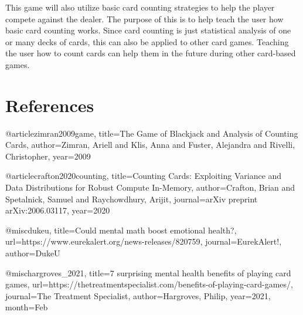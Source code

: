 \documentclass[12pt]{article}
\begin{document}
This game will also utilize basic card counting strategies to help the player compete against the dealer. The purpose of this is to help teach the user how basic card counting works. Since card counting is just statistical analysis of one or many decks of cards, this can also be applied to other card games. Teaching the user how to count cards can help them in the future during other card-based games. 


\newpage
\section{References}
\printbibliography[heading=subbibintoc]



@article{zimran2009game,
  title={The Game of Blackjack and Analysis of Counting Cards},
  author={Zimran, Ariell and Klis, Anna and Fuster, Alejandra and Rivelli, Christopher},
  year={2009}
}

@article{crafton2020counting,
  title={Counting Cards: Exploiting Variance and Data Distributions for Robust Compute In-Memory},
  author={Crafton, Brian and Spetalnick, Samuel and Raychowdhury, Arijit},
  journal={arXiv preprint arXiv:2006.03117},
  year={2020}
}

@misc{dukeu, title={Could mental math boost emotional health?}, url={https://www.eurekalert.org/news-releases/820759}, journal={EurekAlert!}, author={DukeU}}
 
@misc{hargroves_2021, title={7 surprising mental health benefits of playing card games}, url={https://thetreatmentspecialist.com/benefits-of-playing-card-games/}, journal={The Treatment Specialist}, author={Hargroves, Philip}, year={2021}, month={Feb}}
\end{document}
